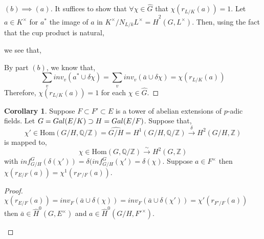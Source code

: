 \documentclass[12pt]{extarticle}
\newcommand{\Z}{\mathbb{Z}}
\newcommand{\Q}{\mathbb{Q}}
\newcommand{\galgroup}[1]{Gal \small(#1 \small)}
\newcommand{\Hom}[2]{\mathrm{Hom}\left( #1, #2 \right)}
\theoremstyle{definition}
\newtheorem{corollary}[theorem]{Corollary}
\begin{document}
\begin{proof}[$(b) \implies (a)$]
It suffices to show that $\forall \chi \in \hat{G}$ that $\chi(r_{L/K}(a)) = 1$. Let $a \in K^\times$ for $a^\ast$ the image of $a$ in $K^\times / N_{L/k} L^\times = \hat{H}^2(G, L^\times)$. Then, using the fact that the cup product is natural,
\begin{center}
\end{center}
we see that,
\begin{center}
\end{center}
By part $(b)$, we know that,
\[ \sum_{v} inv_v(a^\ast \cup \delta \chi) = \sum_{v} inv_v( \bar{a} \cup \delta \chi) = \chi(r_{L/K}(a)) \]
Therefore, $\chi(r_{L/K}(a)) = 1$ for each $\chi \in \hat{G}$. 
\end{proof}

\begin{corollary}
Suppose $F \subset F' \subset E$ is a tower of abelian extensions of $p$-adic fields. Let $G = \galgroup{E/K} \supset H = \galgroup{E/F}$. Suppose that, 
\[\chi' \in \Hom{G/H}{\Q/\Z} = \widehat{G/H} = H^1(G/H, \Q/ \Z) \xrightarrow{\delta} H^2(G/H, \Z) \]
is mapped to,
\[ \chi \in \Hom{G}{\Q / \Z} \xrightarrow{\sim} H^2(G, \Z) \] 
with $inf_{G/H}^G(\delta(\chi')) = \delta(inf_{G/H}^G(\chi') = \delta(\chi)$. Suppose $a \in F^\times$ then $\chi(r_{E/F}(a)) = \chi^1(r_{F'/F}(a))$.
\end{corollary}

\begin{proof}
$\chi(r_{E/F}(a)) = inv_F(\bar{a} \cup \delta (\chi)) = inv_F(\bar{a} \cup \delta (\chi')) = \chi'(r_{F'/F}(a))$ then $\bar{a} \in \hat{H}^0(G, E^\times)$ and $a \in \hat{H}^0(G/H, F'^\times)$. 

\begin{center}
\end{center}
\end{proof}
\end{document}
